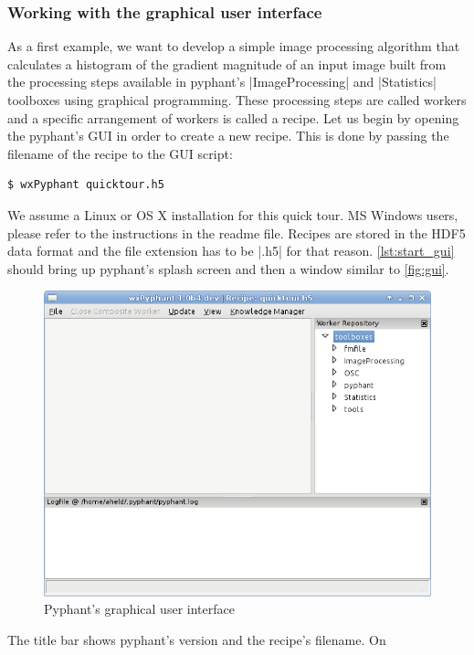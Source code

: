 \documentclass[a4paper]{article}
\begin{document}
\subsubsection{Working with the graphical user interface}
\label{sec:introduction_gui}

As a first example, we want to develop a simple image processing
algorithm that calculates a histogram of the gradient magnitude of an
input image built from the processing steps available in pyphant's
|ImageProcessing| and |Statistics| toolboxes using graphical
programming. These processing steps are called workers and a specific
arrangement of workers is called a recipe. Let us begin by opening the
pyphant's GUI in order to create a new recipe. This is done by passing
the filename of the recipe to the GUI script:
\begin{lstlisting}[style=terminal,label={lst:start_gui},caption={Invoking
the GUI}]
$ wxPyphant quicktour.h5
\end{lstlisting}
We assume a Linux or OS X installation for this quick tour. MS Windows
users, please refer to the instructions in the readme
file\cite{wingui}. Recipes are stored in the HDF5\cite{hdf5} data
format and the file extension has to be |.h5| for that
reason. \autoref{lst:start_gui} should bring up pyphant's splash
screen and then a window similar to \autoref{fig:gui}.
\begin{figure}[h]
  \centering
  \includegraphics[scale=0.75]{fig/gui.png}
  \caption{Pyphant's graphical user interface}
  \label{fig:gui}
\end{figure}
The title bar shows pyphant's version and the recipe's filename. On
\end{document}
